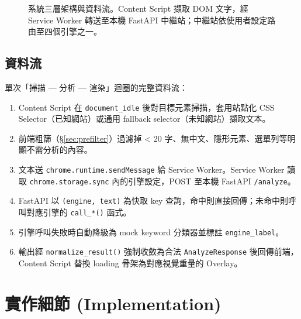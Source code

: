 \documentclass[11pt, a4paper]{article}
\begin{document}
\begin{figure}[h]
  \centering
  \caption{系統三層架構與資料流。Content Script 擷取 DOM 文字，經 Service Worker 轉送至本機 FastAPI 中繼站；中繼站依使用者設定路由至四個引擎之一。}
  \label{fig:arch}
\end{figure}

\subsection{資料流}
單次「掃描 — 分析 — 渲染」迴圈的完整資料流：

\begin{enumerate}[leftmargin=2em]
  \item Content Script 在 \texttt{document\_idle} 後對目標元素掃描，套用站點化 CSS Selector（已知網站）或通用 fallback selector（未知網站）擷取文本。
  \item 前端粗篩（\S\ref{sec:prefilter}）過濾掉 < 20 字、無中文、隱形元素、選單列等明顯不需分析的內容。
  \item 文本送 \texttt{chrome.runtime.sendMessage} 給 Service Worker。Service Worker 讀取 \texttt{chrome.storage.sync} 內的引擎設定，POST 至本機 FastAPI \texttt{/analyze}。
  \item FastAPI 以 \texttt{(engine, text)} 為快取 key 查詢，命中則直接回傳；未命中則呼叫對應引擎的 \texttt{call\_*()} 函式。
  \item 引擎呼叫失敗時自動降級為 mock keyword 分類器並標註 \texttt{engine\_label}。
  \item 輸出經 \texttt{normalize\_result()} 強制收斂為合法 \texttt{AnalyzeResponse} 後回傳前端，Content Script 替換 loading 骨架為對應視覺重量的 Overlay。
\end{enumerate}

\section{實作細節 (Implementation)}\label{sec:impl}
\end{document}
